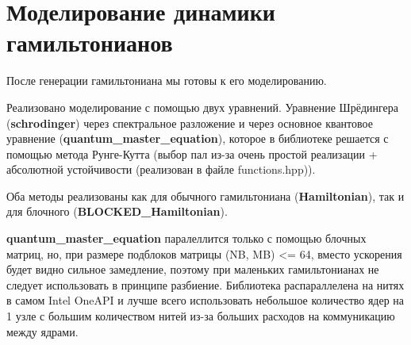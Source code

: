 \documentclass[12pt,fleqn]{article}
\begin{document}
        \section{Моделирование динамики гамильтонианов}
        После генерации гамильтониана мы готовы к его моделированию.

        Реализовано моделирование с помощью двух уравнений. Уравнение Шрёдингера (\textbf{schrodinger}) через спектральное разложение и
        через основное квантовое уравнение \newline (\textbf{quantum\_master\_equation}),
        которое в библиотеке решается с помощью метода \textsf{Рунге-Кутта} (выбор пал из-за очень простой реализации + абсолютной устойчивости (реализован в файле \textsf{functions.hpp})).

        Оба методы реализованы как для обычного гамильтониана (\textbf{Hamiltonian}), так и для блочного (\textbf{BLOCKED\_Hamiltonian}).

        \textbf{quantum\_master\_equation} паралеллится только с помощью блочных матриц, но, при размере подблоков матрицы (NB, MB) <= 64, вместо ускорения будет видно сильное замедление, поэтому при 
        маленьких гамильтонианах не следует использовать в принципе разбиение. Библиотека распараллелена на нитях в самом Intel OneAPI и
        лучше всего использовать небольшое количество ядер на 1 узле с большим количеством нитей из-за больших расходов на коммуникацию между ядрами.


        



\end{document}
